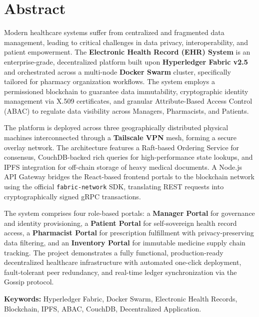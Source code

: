 \chapter*{Abstract}

Modern healthcare systems suffer from centralized and fragmented data management, leading to critical challenges in data privacy, interoperability, and patient empowerment. The \textbf{Electronic Health Record (EHR) System} is an enterprise-grade, decentralized platform built upon \textbf{Hyperledger Fabric v2.5} and orchestrated across a multi-node \textbf{Docker Swarm} cluster, specifically tailored for pharmacy organization workflows. The system employs a permissioned blockchain to guarantee data immutability, cryptographic identity management via X.509 certificates, and granular Attribute-Based Access Control (ABAC) to regulate data visibility across Managers, Pharmacists, and Patients.

The platform is deployed across three geographically distributed physical machines interconnected through a \textbf{Tailscale VPN} mesh, forming a secure overlay network. The architecture features a Raft-based Ordering Service for consensus, CouchDB-backed rich queries for high-performance state lookups, and IPFS integration for off-chain storage of heavy medical documents. A Node.js API Gateway bridges the React-based frontend portals to the blockchain network using the official \texttt{fabric-network} SDK, translating REST requests into cryptographically signed gRPC transactions.

The system comprises four role-based portals: a \textbf{Manager Portal} for governance and identity provisioning, a \textbf{Patient Portal} for self-sovereign health record access, a \textbf{Pharmacist Portal} for prescription fulfillment with privacy-preserving data filtering, and an \textbf{Inventory Portal} for immutable medicine supply chain tracking. The project demonstrates a fully functional, production-ready decentralized healthcare infrastructure with automated one-click deployment, fault-tolerant peer redundancy, and real-time ledger synchronization via the Gossip protocol.

\vspace{1em}
\noindent\textbf{Keywords:} Hyperledger Fabric, Docker Swarm, Electronic Health Records, Blockchain, IPFS, ABAC, CouchDB, Decentralized Application.
\newpage
